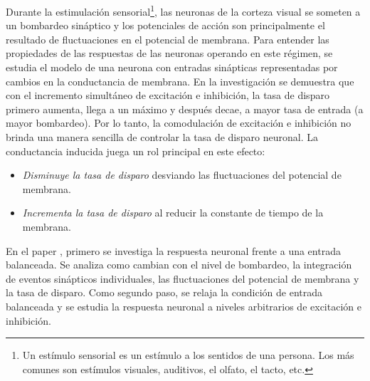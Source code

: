 Durante la estimulación sensorial\footnote{Un estímulo sensorial es un estímulo a los sentidos de una persona. Los más comunes son estímulos visuales, auditivos, el olfato, el tacto, etc.}, las neuronas de la corteza visual se someten a un bombardeo sináptico y los potenciales de acción son principalmente el resultado de fluctuaciones en el potencial de membrana. Para entender las propiedades de las respuestas de las neuronas operando en este régimen, se estudia el modelo de una neurona con entradas sinápticas representadas por cambios en la conductancia de membrana. En la investigación \cite{Kuhn2345} se demuestra que con el incremento simultáneo de excitación e inhibición, la tasa de disparo primero aumenta, llega a un máximo y después decae, a mayor tasa de entrada (a mayor bombardeo). Por lo tanto, la comodulación de excitación e inhibición no brinda una manera sencilla de controlar la tasa de disparo neuronal. La conductancia inducida juega un rol principal en este efecto:
\begin{itemize}
    \item \textit{Disminuye la tasa de disparo} desviando las fluctuaciones del potencial de membrana.
    \item \textit{Incrementa la tasa de disparo} al reducir la constante de tiempo de la membrana.
\end{itemize}
En el paper \cite{Kuhn2345}, primero se investiga la respuesta neuronal frente a una entrada balanceada. Se analiza como cambian con el nivel de bombardeo, la integración de eventos sinápticos individuales, las fluctuaciones del potencial de membrana y la tasa de disparo. Como segundo paso, se relaja la condición de entrada balanceada y se estudia la respuesta neuronal a niveles arbitrarios de excitación e inhibición.
